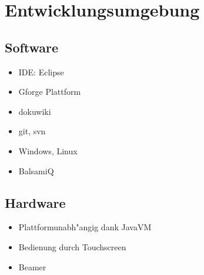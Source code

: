 \section{Entwicklungsumgebung}


\subsection{Software}
	
\begin{itemize}

	\item IDE: Eclipse
	\item Gforge Plattform
	\item dokuwiki
	\item git, svn
	\item Windows, Linux
	\item BalsamiQ

\end{itemize}

\subsection{Hardware}
\begin{itemize}
	\item Plattformunabh"angig dank JavaVM
	\item Bedienung durch Touchscreen
	\item Beamer
\end{itemize}
